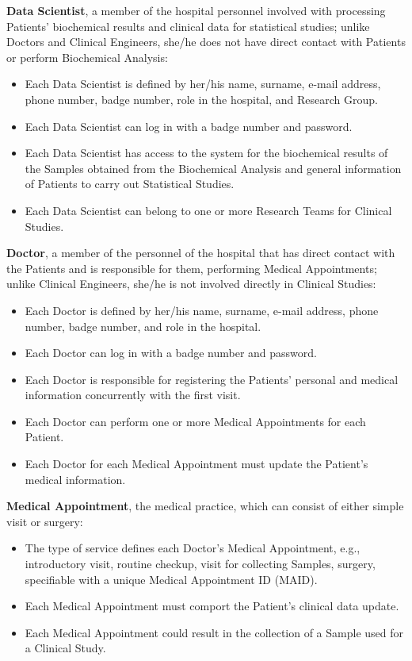 \textbf{Data Scientist}, a member of the hospital personnel involved with processing Patients' biochemical results and clinical data for statistical studies; unlike Doctors and Clinical Engineers, she/he does not have direct contact with Patients or perform Biochemical Analysis:
\begin{itemize}
    \item Each Data Scientist is defined by her/his name, surname, e-mail address, phone number, badge number, role in the hospital, and Research Group.
    \item Each Data Scientist can log in with a badge number and password.
    \item Each Data Scientist has access to the system for the biochemical results of the Samples obtained from the Biochemical Analysis and general information of Patients to carry out Statistical Studies.
    \item Each Data Scientist can belong to one or more Research Teams for Clinical Studies.
\end{itemize}
\textbf{Doctor}, a member of the personnel of the hospital that has direct contact with the Patients and is responsible for them, performing Medical Appointments; unlike Clinical Engineers, she/he is not involved directly in Clinical Studies:
\begin{itemize}
    \item Each Doctor is defined by her/his name, surname, e-mail address, phone number, badge number, and role in the hospital.
    \item Each Doctor can log in with a badge number and password.
    \item Each Doctor is responsible for registering the Patients' personal and medical information concurrently with the first visit.
    \item Each Doctor can perform one or more Medical Appointments for each Patient.
    \item Each Doctor for each Medical Appointment must update the Patient's medical information.
\end{itemize}
\textbf{Medical Appointment}, the medical practice, which can consist of either simple visit or surgery:
\begin{itemize}
    \item The type of service defines each Doctor's Medical Appointment, e.g., introductory visit, routine checkup, visit for collecting Samples, surgery, specifiable with a unique Medical Appointment ID (MAID).
    \item Each Medical Appointment must comport the Patient's clinical data update.
    \item Each Medical Appointment could result in the collection of a Sample used for a Clinical Study.
\end{itemize}
